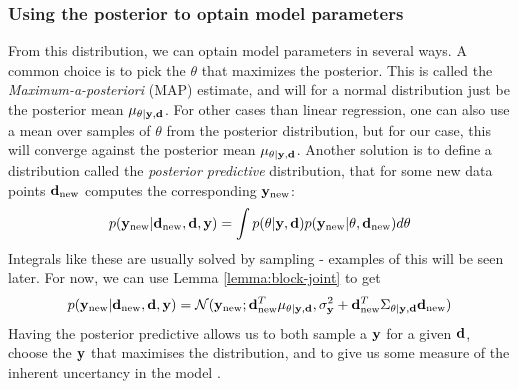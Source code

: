 \subsubsection{Using the posterior to optain model parameters}
From this distribution, we can optain model parameters in several ways. 
A common choice is to pick the $\theta$ that maximizes the posterior. This is called the \textit{Maximum-a-posteriori} (MAP) estimate, and will for a normal distribution just be the posterior mean $\mu_{\theta | \mathbf{y}, \mathbf{d}}$.
For other cases than linear regression, one can also use a mean over samples of $\theta$ from the posterior distribution, but for our case, this will converge against the posterior mean $\mu_{\theta | \mathbf{y}, \mathbf{d}}$.
Another solution is to define a distribution called the \textit{posterior predictive} distribution, that for some new data points $\mathbf{d}_{\textrm{new}}$ computes the corresponding $\mathbf{y}_{\textrm{new}}$:
\begin{equation}p(\mathbf{y}_{\textrm{new}} | \mathbf{d}_{\textrm{new}}, \mathbf{d}, \mathbf{y}) = \int p(\theta | \mathbf{y}, \mathbf{d}) p(\mathbf{y}_{\textrm{new}} | \theta, \mathbf{d}_\textrm{new})d\theta\end{equation}
Integrals like these are usually solved by sampling - examples of this will be seen later. For now, we can use Lemma \ref{lemma:block-joint} to get
\begin{equation}p(\mathbf{y}_{\textrm{new}} | \mathbf{d}_{\textrm{new}}, \mathbf{d}, \mathbf{y}) = \mathcal{N}(\mathbf{y}_\textrm{new}; \mathbf{d}_\textrm{new}^T\mu_{\theta|\mathbf{y}, \mathbf{d}}, \sigma^2_{\mathbf{y}} + \mathbf{d}_\textrm{new}^T\Sigma_{\theta | \mathbf{y}, \mathbf{d}}\mathbf{d}_\textrm{new})\end{equation}
Having the posterior predictive allows us to both sample a $\mathbf{y}$ for a given $\mathbf{d}$, choose the $\mathbf{y}$ that maximises the distribution, and to give us some measure of the inherent uncertancy in the model \cite{krause22}.

